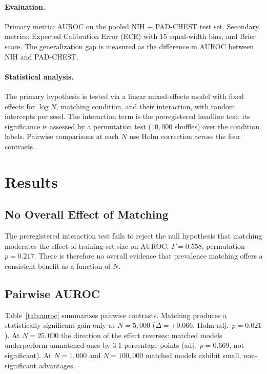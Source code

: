 \documentclass[11pt]{article}
\begin{document}
\paragraph{Evaluation.} Primary metric: AUROC on the pooled NIH + PAD-CHEST test set. Secondary metrics: Expected Calibration Error (ECE) with 15 equal-width bins, and Brier score. The generalization gap is measured as the difference in AUROC between NIH and PAD-CHEST.

\paragraph{Statistical analysis.} The primary hypothesis is tested via a linear mixed-effects model with fixed effects for $\log N$, matching condition, and their interaction, with random intercepts per seed. The interaction term is the preregistered headline test; its significance is assessed by a permutation test ($10{,}000$ shuffles) over the condition labels. Pairwise comparisons at each $N$ use Holm correction across the four contrasts.

\section{Results}

\subsection{No Overall Effect of Matching}
The preregistered interaction test fails to reject the null hypothesis that matching moderates the effect of training-set size on AUROC: $F = 0.558$, permutation $p = 0.217$. There is therefore no overall evidence that prevalence matching offers a consistent benefit as a function of $N$.

\subsection{Pairwise AUROC}
Table~\ref{tab:auroc} summarizes pairwise contrasts. Matching produces a statistically significant gain only at $N=5{,}000$ ($\Delta = +0.066$, Holm-adj.\ $p = 0.021$). At $N=25{,}000$ the direction of the effect reverses: matched models underperform unmatched ones by 3.1 percentage points (adj.\ $p = 0.669$, not significant). At $N=1{,}000$ and $N=100{,}000$ matched models exhibit small, non-significant advantages.
\end{document}
